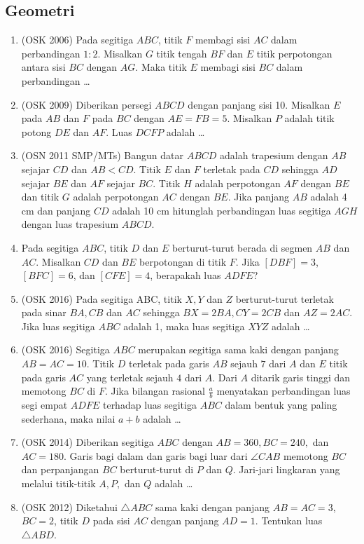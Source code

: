 \subsection{Geometri}
\begin{enumerate}
    \item (OSK 2006) Pada segitiga $ABC$, titik $F$ membagi sisi $AC$ dalam perbandingan $1 : 2$. 
Misalkan $G$ titik tengah $BF$ dan $E$ titik perpotongan antara sisi $BC$ dengan $AG$. Maka titik $E$ membagi sisi $BC$
dalam perbandingan \dots

\item (OSK 2009) Diberikan persegi $ABCD$ dengan panjang sisi 10. Misalkan $E$ pada $AB$ dan $F$
pada $BC$ dengan $AE = FB = 5$. Misalkan $P$ adalah titik potong $DE$ dan $AF$. Luas $DCFP$ adalah \dots

\item (OSN 2011 SMP/MTs) Bangun datar $ABCD$ adalah
trapesium dengan $AB$ sejajar $CD$ dan $AB < CD$. Titik $E$ dan $F$ terletak
pada $CD$ sehingga $AD$ sejajar $BE$ dan $AF$ sejajar $BC$. Titik $H$ 
adalah perpotongan $AF$ dengan $BE$ dan titik $G$ adalah 
perpotongan $AC$ dengan $BE$. Jika panjang $AB$ adalah 4 cm
dan panjang $CD$ adalah 10 cm hitunglah perbandingan luas 
segitiga $AGH$ dengan luas trapesium $ABCD$. 

\item Pada segitiga $ABC$, titik $D$ dan $E$ berturut-turut berada di segmen $AB$ dan $AC$. Misalkan $CD$ dan $BE$ berpotongan di titik $F$. Jika $[DBF]=3$, $[BFC]=6$, dan $[CFE]=4$, berapakah luas $ADFE$?

\item (OSK 2016) Pada segitiga ABC, titik $X, Y$ dan $Z$ berturut-turut terletak pada sinar $BA, CB$ dan $AC$
	sehingga $BX = 2BA, CY = 2CB$ dan $AZ = 2AC$. Jika luas segitiga $ABC$ adalah 1, maka luas
	segitiga $XYZ$ adalah \dots
	
\item (OSK 2016) Segitiga $ABC$ merupakan segitiga sama kaki dengan panjang $AB = AC = 10 $.
	Titik $D$ terletak pada garis $AB$ sejauh $7 $ dari $A$ dan $E$ titik pada garis $AC$ yang
	terletak sejauh $4 $ dari $A$. Dari $A$ ditarik garis tinggi dan memotong $BC$ di $F$.
	Jika bilangan rasional $\frac{a}{b}$ menyatakan perbandingan luas segi empat $ADFE$ terhadap
	luas segitiga $ABC$ dalam bentuk yang paling sederhana, maka nilai $a + b$ adalah \dots
	
	\item (OSK 2014) Diberikan segitiga $ABC$ dengan $AB = 360, BC = 240,$ dan $AC = 180$. Garis
	bagi dalam dan garis bagi luar dari $\angle CAB$ memotong $BC$ dan perpanjangan $BC$
	berturut-turut di $P$ dan $Q$. Jari-jari lingkaran yang melalui titik-titik $A, P,$ dan $Q$
	adalah \dots
	
	\item (OSK 2012) Diketahui $\triangle ABC$ sama kaki dengan panjang $AB = AC = 3$, $BC = 2$, titik $D$ pada sisi $AC$ dengan panjang $AD = 1$. Tentukan luas $\triangle ABD$.
\end{enumerate}